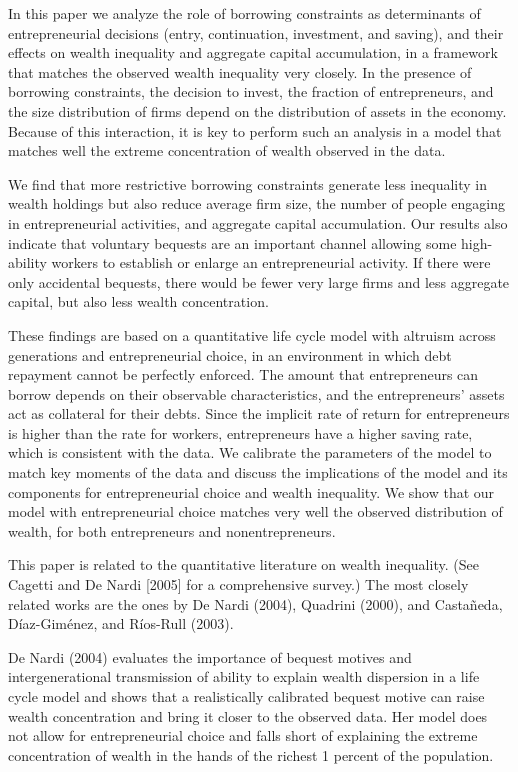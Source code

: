 \documentclass[10pt]{article}
\begin{document}
In this paper we analyze the role of borrowing constraints as determinants of entrepreneurial decisions (entry, continuation, investment, and saving), and their effects on wealth inequality and aggregate capital accumulation, in a framework that matches the observed wealth inequality very closely. In the presence of borrowing constraints, the decision to invest, the fraction of entrepreneurs, and the size distribution of firms depend on the distribution of assets in the economy. Because of this interaction, it is key to perform such an analysis in a model that matches well the extreme concentration of wealth observed in the data.

We find that more restrictive borrowing constraints generate less inequality in wealth holdings but also reduce average firm size, the number of people engaging in entrepreneurial activities, and aggregate capital accumulation. Our results also indicate that voluntary bequests are an important channel allowing some high-ability workers to establish or enlarge an entrepreneurial activity. If there were only accidental bequests, there would be fewer very large firms and less aggregate capital, but also less wealth concentration.

These findings are based on a quantitative life cycle model with altruism across generations and entrepreneurial choice, in an environment in which debt repayment cannot be perfectly enforced. The amount that entrepreneurs can borrow depends on their observable characteristics, and the entrepreneurs' assets act as collateral for their debts. Since the implicit rate of return for entrepreneurs is higher than the rate for workers, entrepreneurs have a higher saving rate, which is consistent with the data. We calibrate the parameters of the model to match key moments of the data and discuss the implications of the model and its components for entrepreneurial choice and wealth inequality. We show that our model with entrepreneurial choice matches very well the observed distribution of wealth, for both entrepreneurs and nonentrepreneurs.

This paper is related to the quantitative literature on wealth inequality. (See Cagetti and De Nardi [2005] for a comprehensive survey.) The most closely related works are the ones by De Nardi (2004), Quadrini (2000), and Castañeda, Díaz-Giménez, and Ríos-Rull (2003).

De Nardi (2004) evaluates the importance of bequest motives and intergenerational transmission of ability to explain wealth dispersion in a life cycle model and shows that a realistically calibrated bequest motive can raise wealth concentration and bring it closer to the observed data. Her model does not allow for entrepreneurial choice and falls short of explaining the extreme concentration of wealth in the hands of the richest 1 percent of the population.
\end{document}
